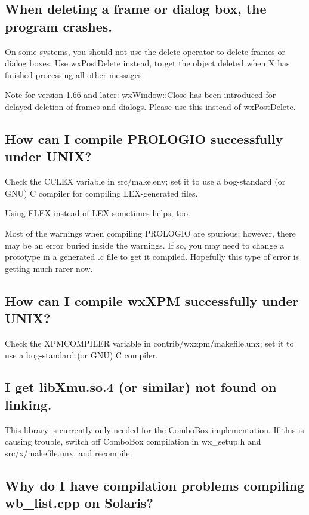 \subsection{When deleting a frame or dialog box, the program crashes.}

On some systems, you should not use the delete operator to delete
frames or dialog boxes. Use wxPostDelete instead, to get the object
deleted when X has finished processing all other messages.

Note for version 1.66 and later: wxWindow::Close has been introduced for
delayed deletion of frames and dialogs. Please use this instead of wxPostDelete.

\subsection{How can I compile PROLOGIO successfully under UNIX?}

Check the CCLEX variable in src/make.env; set it to use a bog-standard
(or GNU) C compiler for compiling LEX-generated files.

Using FLEX instead of LEX sometimes helps, too.

Most of the warnings when compiling PROLOGIO are spurious; however,
there may be an error buried inside the warnings. If so, you may need
to change a prototype in a generated .c file to get it compiled.
Hopefully this type of error is getting much rarer now.

\subsection{How can I compile wxXPM successfully under UNIX?}

Check the XPMCOMPILER variable in contrib/wxxpm/makefile.unx; set it to use a bog-standard
(or GNU) C compiler.

\subsection{I get libXmu.so.4 (or similar) not found on linking.}

This library is currently only needed for the ComboBox implementation. If this is causing trouble,
switch off ComboBox compilation in wx\_setup.h and src/x/makefile.unx, and recompile.

\subsection{Why do I have compilation problems compiling wb\_list.cpp on Solaris?}

